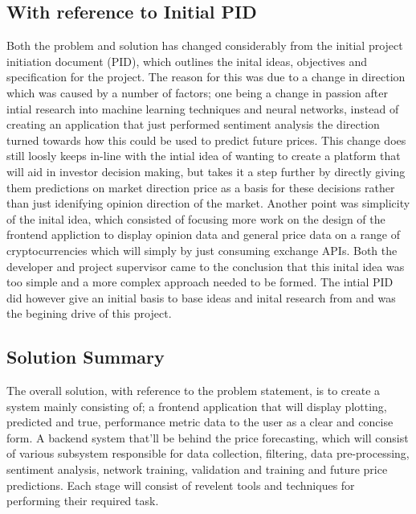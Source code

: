 \documentclass[oneside, 10pt]{article}
\begin{document}
		\subsection{With reference to Initial PID}
		Both the problem and solution has changed considerably from the initial project initiation document (PID), which outlines the inital ideas, objectives and specification for the project. The reason for this was due to a change in direction which was caused by a number of factors; one being a change in passion after intial research into machine learning techniques and neural networks, instead of creating an application that just performed sentiment analysis the direction turned towards how this could be used to predict future prices. This change does still loosly keeps in-line with the intial idea of wanting to create a platform that will aid in investor decision making, but takes it a step further by directly giving them predictions on market direction price as a basis for these decisions rather than just idenifying opinion direction of the market. 
		Another point was simplicity of the inital idea, which consisted of focusing more work on the design of the frontend appliction to display opinion data and general price data on a range of cryptocurrencies which will simply by just consuming exchange APIs. Both the developer and project supervisor came to the conclusion that this inital idea was too simple and a more complex approach needed to be formed.
		The intial PID did however give an initial basis to base ideas and inital research from and was the begining drive of this project.
		
		\subsection{Solution Summary}\label{summary}
		The overall solution, with reference to the problem statement, is to create a system mainly consisting of; a frontend application that will display plotting, predicted and true, performance metric data to the user as a clear and concise form. A backend system that'll be behind the price forecasting, which will consist of various subsystem responsible for data collection, filtering, data pre-processing, sentiment analysis, network training, validation and training and future price predictions. Each stage will consist of revelent tools and techniques for performing their required task.
		
		
\end{document}
